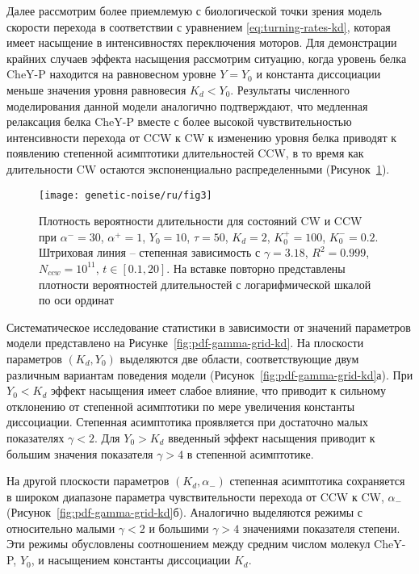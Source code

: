 Далее рассмотрим более приемлемую с биологической точки зрения модель скорости перехода в соответствии с уравнением \cref{eq:turning-rates-kd}, которая имеет насыщение в интенсивностях переключения моторов. Для демонстрации крайних случаев эффекта насыщения рассмотрим ситуацию, когда уровень белка CheY-P находится на равновесном уровне $Y = Y_0$ и константа диссоциации меньше значения уровня равновесия $K_d < Y_0$. Результаты численного моделирования данной модели аналогично подтверждают, что медленная релаксация белка CheY-P вместе с более высокой чувствительностью интенсивности перехода от CCW к CW к изменению уровня белка приводят к появлению степенной асимптотики длительностей CCW, в то время как длительности CW остаются экспоненциально распределенными (Рисунок~\cref{fig:pdf-kd-powerlaw}).

\begin{figure}[ht]
    \centering
    \texttt{[image: genetic-noise/ru/fig3]}
    \caption{
        Плотность вероятности длительности для состояний CW и CCW при $\alpha^- = 30$, $\alpha^+ = 1$, $Y_0 = 10$, $\tau = 50$, $K_d = 2$, $K^+_0 = 100$, $K^-_0 = 0.2$. Штриховая линия -- степенная зависимость с $\gamma = 3.18$, $R^2 = 0.999$, $N_{ccw} = 10^{11}$, $t \in [0.1, 20]$. На вставке повторно представлены плотности вероятностей длительностей с логарифмической шкалой по оси ординат
    }
    \label{fig:pdf-kd-powerlaw}
\end{figure}

Систематическое исследование статистики в зависимости от значений параметров модели представлено на Рисунке~\cref{fig:pdf-gamma-grid-kd}. На плоскости параметров $(K_d, Y_0)$ выделяются две области, соответствующие двум различным вариантам поведения модели (Рисунок~\cref{fig:pdf-gamma-grid-kd}а). При $Y_0 < K_d$ эффект насыщения имеет слабое влияние, что приводит к сильному отклонению от степенной асимптотики по мере увеличения константы диссоциации. Степенная асимптотика проявляется при достаточно малых показателях $\gamma < 2$. Для $Y_0 > K_d$ введенный эффект насыщения приводит к большим значения показателя $\gamma > 4$ в степенной асимптотике. 

На другой плоскости параметров $(K_d, \alpha_-)$ степенная асимптотика сохраняется в широком диапазоне параметра чувствительности перехода от CCW к CW, $\alpha_-$ (Рисунок~\cref{fig:pdf-gamma-grid-kd}б). Аналогично выделяются режимы с относительно малыми $\gamma < 2$ и большими $\gamma > 4$ значениями показателя степени. Эти режимы обусловлены соотношением между средним числом молекул CheY-P, $Y_0$, и насыщением константы диссоциации $K_d$.

